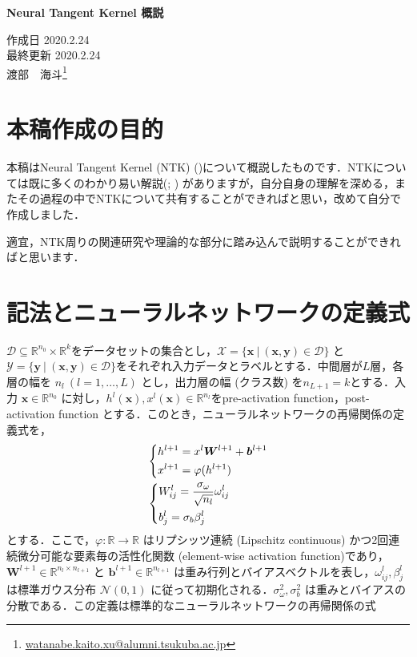 \documentclass[a4paper]{bxjsarticle}
\makeatletter
\newcommand{\mytitle}{Neural Tangent Kernel 概説}
\newcommand{\myhead}{
\begin{center}%
\textbf{\LARGE\mytitle}%
\end{center}%
\vspace{0.7em}
\begin{flushright}%
作成日 2020.2.24\\%
最終更新 2020.2.24\\%
渡部　海斗\footnote{\protect\url{watanabe.kaito.xu@alumni.tsukuba.ac.jp}}%
\end{flushright}}
\theoremstyle{definition}
\makeatother
\begin{document}
\myhead

\section{本稿作成の目的}
本稿はNeural Tangent Kernel (NTK) (\citealp{jacot2018neural})について概説したものです．NTKについては既に多くのわかり易い解説(\citealp{rajat2019ntk}; \citealp{甘利俊一2014情報幾何学の新展開}) がありますが，自分自身の理解を深める，またその過程の中でNTKについて共有することができればと思い，改めて自分で作成しました．

適宜，NTK周りの関連研究や理論的な部分に踏み込んで説明することができればと思います．

\section{記法とニューラルネットワークの定義式}
\label{notation}
$\mathcal{D} \subseteq \mathbb{R}^{n_0} \times \mathbb{R}^{k}$をデータセットの集合とし，$\mathcal{X}=\{\bm{x} \ | \ (\bm{x},\bm{y}) \in \mathcal{D}\}$ と $\mathcal{Y}=\{\bm{y} \ | \ (\bm{x},\bm{y}) \in \mathcal{D}\}$をそれぞれ入力データとラベルとする．中間層が$L$層，各層の幅を $n_l  \ (l=1,\ldots,L)$ とし，出力層の幅 (クラス数) を$n_{L+1}=k$とする．入力 $\bm{x} \in \mathbb{R}^{n_0}$ に対し，$h^{l}(\bm{x}), x^{l}(\bm{x}) \in \mathbb{R}^{n_l}$をpre-activation function，post-activation function とする．このとき，ニューラルネットワークの再帰関係の定義式を，
\begin{align}
    &\begin{dcases}
        h^{l+1} = x^{l}\bm{W}^{l+1} + \bm{b}^{l+1} \\
        x^{l+1} = \varphi(h^{l+1})
    \end{dcases}
    \\
    &\begin{dcases}
        W_{ij}^{l} = \dfrac{\sigma_{\omega}}{\sqrt{n_l}}\omega_{ij}^{l} \\
        b_{j}^{l} = \sigma_b \beta_{j}^{l}
    \end{dcases}
\end{align}
とする．ここで，$\varphi:\mathbb{R} \rightarrow \mathbb{R}$ はリプシッツ連続 (Lipschitz continuous) かつ2回連続微分可能な要素毎の活性化関数 (element-wise activation function)であり，$\bm{W}^{l+1} \in \mathbb{R}^{n_{l} \times n_{l+1}}$ と $\bm{b}^{l+1} \in \mathbb{R}^{n_{l+1}}$ は重み行列とバイアスベクトルを表し，$\omega_{ij}^{l},\beta_{j}^{l}$ は標準ガウス分布 $\mathcal{N}(0, 1)$ に従って初期化される．$\sigma_{\omega}^2, \sigma_{b}^2$ は重みとバイアスの分散である．この定義は標準的なニューラルネットワークの再帰関係の式
\end{document}
